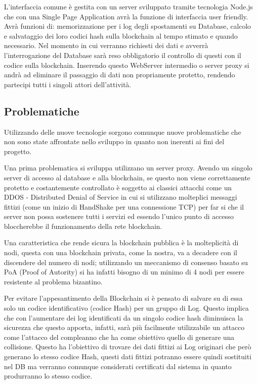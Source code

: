 \documentclass[11pt,a4paper,titlepage,twoside,openright]{report}
\begin{document}
L'interfaccia comune è gestita con un server sviluppato tramite tecnologia Node.js che con una Single Page Application avrà la funzione di interfaccia user friendly. Avrà funzioni di: memorizzazione per i log degli spostamenti su Database, calcolo e salvataggio dei loro codici hash sulla blockchain al tempo stimato e quando necessario. Nel momento in cui verranno richiesti dei dati e avverrà l'interrogazione del Database sarà reso obbligatorio il controllo di questi con il codice sulla blockchain. Inserendo questo WebServer intermedio o server proxy si andrà ad eliminare il passaggio di dati non propriamente protetto, rendendo partecipi tutti i singoli attori dell'attività.

\subsection{Problematiche}
Utilizzando delle nuove tecnologie sorgono comunque nuove problematiche che non sono state affrontate nello sviluppo in quanto non inerenti ai fini del progetto.

Una prima problematica si sviluppa utilizzano un server proxy. Avendo un singolo server di accesso al database e alla blockchain, se questo non viene correttamente protetto e costantemente controllato è soggetto ai classici attacchi come un DDOS - Distributed Denial of Service in cui si utilizzano molteplici messaggi fittizi (come un inizio di HandShake per una connessione TCP) per far si che il server non possa sostenere tutti i servizi ed essendo l'unico punto di accesso bloccherebbe il funzionamento della rete blockchain.

Una caratteristica che rende sicura la blockchain pubblica è la molteplicità di nodi, questa con una blockchain privata, come la nostra, va a decadere con il discendere  del numero di nodi; utilizzando un meccanismo di consenso basato su PoA (Proof of Autority) si ha infatti bisogno di un minimo di 4 nodi per essere resistente al problema bizantino.

Per evitare l'appesantimento della Blockchain si è pensato di salvare su di essa solo un codice identificativo (codice Hash) per un gruppo di Log. Questo implica che con l'aumentare dei log identificati da un singolo codice hash diminuisca la sicurezza che questo apporta, infatti, sarà più facilmente utilizzabile un attacco come l'attacco del compleanno che ha come obiettivo quello di generare una collisione. Questo ha l'obiettivo di trovare dei dati fittizi ai Log originari che però generano lo stesso codice Hash, questi dati fittizi potranno essere quindi sostituiti nel DB ma verranno comunque considerati certificati dal sistema in quanto produrranno lo stesso codice.
\end{document}
